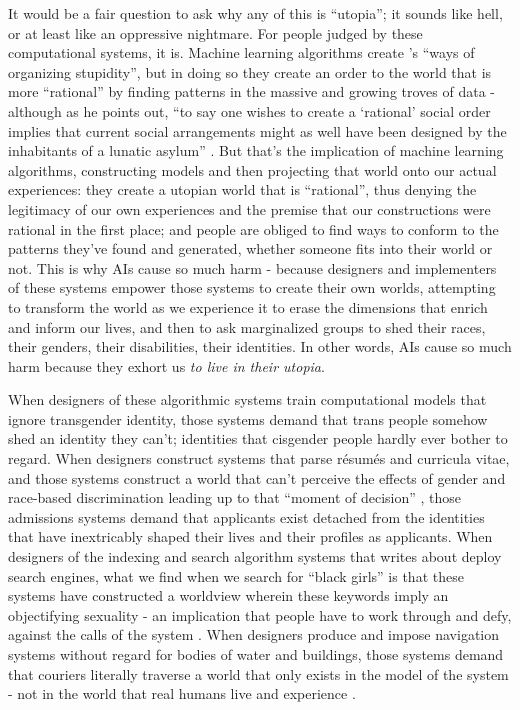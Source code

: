 \documentclass[manuscript,screen]{acmart}
\begin{document}
It would be a fair question to ask why any of this is ``utopia'';
it sounds like hell, or at least like an oppressive nightmare.
For people judged by these computational systems, it is.
Machine learning algorithms create \citeauthor{graeber2015utopia}'s ``ways of organizing stupidity'', but in doing so they create an order to the world that is more ``rational'' by finding patterns in the massive and growing troves of data - although as he points out, ``to say one wishes to create a `rational' social order implies that current social arrangements might as well have been designed by the inhabitants of a lunatic asylum''
\cite{graeber2015utopia}.
But that's the implication of machine learning algorithms, constructing models and then projecting that world onto our actual experiences: they create a utopian world that is ``rational'', thus denying the legitimacy of our own experiences and the premise that our constructions were rational in the first place;
and people are obliged to find ways to conform to the patterns they've found and generated, whether someone fits into their world or not.
This is why AIs cause so much harm - because designers and implementers of these systems empower those systems to create their own worlds, attempting to transform the world as we experience it to erase the dimensions that enrich and inform our lives, and then to ask marginalized groups to shed their races, their genders, their disabilities, their identities.
In other words, AIs cause so much harm because they exhort us \emph{to live in their utopia}.

When designers of these algorithmic systems train computational models that ignore transgender identity, those systems demand that trans people somehow shed an identity they can't;
identities that cisgender people hardly ever bother to regard.
When designers construct systems that parse résumés and curricula vitae, and those systems construct a world that can't perceive the effects of gender and race-based discrimination leading up to that ``moment of decision''
\cite{streetLevelAlgorithms}, those admissions systems demand that applicants exist detached from the identities that have inextricably shaped their lives and their profiles as applicants.
When designers of the indexing and search algorithm systems that \citeauthor{noble2018algorithms} writes about deploy search engines, what we find when we search for ``black girls'' is that these systems have constructed a worldview wherein these keywords imply an objectifying sexuality - an implication that people have to work through and defy, against the calls of the system
\cite{noble2018algorithms}.
When designers produce and impose navigation systems without regard for bodies of water and buildings, those systems demand that couriers literally traverse a world that only exists in the model of the system - not in the world that real humans live and experience
\cite{GoJekAlgo}.
\end{document}
